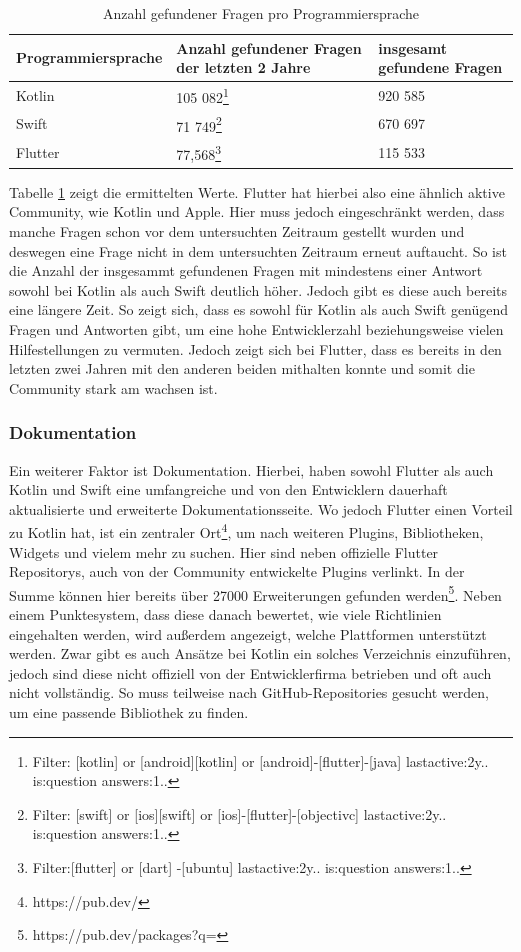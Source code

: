\begin{table}
\centering
\caption{Anzahl gefundener Fragen pro Programmiersprache}
\begin{tabular}{ |p{3.7cm}||p{5cm}| p{5cm}|}
 \hline
 Programmiersprache & Anzahl gefundener Fragen der letzten 2 Jahre & insgesamt gefundene Fragen\\
 \hline
 Kotlin &  105 082\footnote{Filter: [kotlin] or [android][kotlin] or [android]-[flutter]-[java] lastactive:2y.. is:question answers:1..} & 920 585\\
  \hline
 Swift  & 71 749\footnote{Filter: [swift] or [ios][swift] or [ios]-[flutter]-[objectivc] lastactive:2y.. is:question answers:1..} & 670 697\\
  \hline
 Flutter & 77,568\footnote{Filter:[flutter] or [dart] -[ubuntu] lastactive:2y.. is:question answers:1..} & 115 533\\
 \hline
\end{tabular}
\label{tab:evaluations_questions_stackoverflow}
\end{table}

Tabelle \ref{tab:evaluations_questions_stackoverflow} zeigt die ermittelten Werte. Flutter hat hierbei also eine ähnlich aktive Community, wie Kotlin und Apple. Hier muss jedoch eingeschränkt werden, dass manche Fragen schon vor dem untersuchten Zeitraum gestellt wurden und deswegen eine Frage nicht in dem untersuchten Zeitraum erneut auftaucht. So ist die Anzahl der insgesammt gefundenen Fragen mit mindestens einer Antwort sowohl bei Kotlin als auch Swift deutlich höher. Jedoch gibt es diese auch bereits eine längere Zeit. So zeigt sich, dass es sowohl für Kotlin als auch Swift genügend Fragen und Antworten gibt, um eine hohe Entwicklerzahl beziehungsweise vielen Hilfestellungen zu vermuten. Jedoch zeigt sich bei Flutter, dass es bereits in den letzten zwei Jahren mit den anderen beiden mithalten konnte und somit die Community stark am wachsen ist.

\subsubsection{Dokumentation}
Ein weiterer Faktor ist Dokumentation. Hierbei, haben sowohl Flutter als auch Kotlin und Swift eine umfangreiche und von den Entwicklern dauerhaft aktualisierte und erweiterte Dokumentationsseite. Wo jedoch Flutter einen Vorteil zu Kotlin hat, ist ein zentraler Ort\footnote{https://pub.dev/}, um nach weiteren Plugins, Bibliotheken, Widgets und vielem mehr zu suchen. Hier sind neben offizielle Flutter Repositorys, auch von der Community entwickelte Plugins verlinkt. In der Summe können hier bereits über 27000 Erweiterungen gefunden werden\footnote{https://pub.dev/packages?q=}. Neben einem Punktesystem, dass diese danach bewertet, wie viele Richtlinien eingehalten werden, wird außerdem angezeigt, welche Plattformen unterstützt werden. Zwar gibt es auch Ansätze bei Kotlin ein solches Verzeichnis einzuführen, jedoch sind diese nicht offiziell von der Entwicklerfirma betrieben und oft auch nicht vollständig. So muss teilweise nach GitHub-Repositories gesucht werden, um eine passende Bibliothek zu finden.


